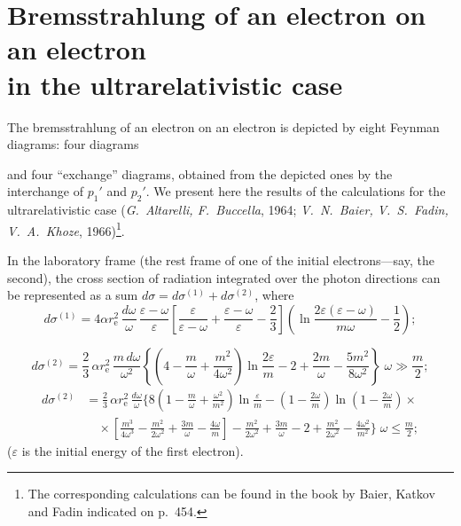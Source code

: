 
\section{Bremsstrahlung of an electron on an electron\\in the ultrarelativistic case}


The bremsstrahlung of an electron on an electron is depicted by eight Feynman diagrams: four diagrams


\vspace{1ex}
\noindent and four ``exchange'' diagrams, obtained from the depicted ones by the interchange of $p_1'$ and $p_2'$. We present here the results of the calculations for the ultrarelativistic case (\emph{G.~Altarelli, F.~Buccella}, 1964; \emph{V.~N.~Baier, V.~S.~Fadin, V.~A.~Khoze}, 1966)\footnote{The corresponding calculations can be found in the book by Baier, Katkov and Fadin indicated on p.~454.}.

In the laboratory frame (the rest frame of one of the initial electrons---say, the second), the cross section of radiation integrated over the photon directions can be represented as a sum $d\sigma = d\sigma^{(1)} + d\sigma^{(2)}$, where
\begin{equation}
d\sigma^{(1)} = 4\alpha r_\mathrm{e}^2\,\frac{d\omega}{\omega}\,\frac{\varepsilon-\omega}{\varepsilon}\!\left[\frac{\varepsilon}{\varepsilon-\omega} + \frac{\varepsilon-\omega}{\varepsilon} - \frac{2}{3}\right]\!\left(\ln\frac{2\varepsilon(\varepsilon-\omega)}{m\omega} - \frac{1}{2}\right);
\label{eq:97.2}
\end{equation}


\begin{equation}
d\sigma^{(2)} = \frac{2}{3}\,\alpha r_\mathrm{e}^2\,\frac{m\,d\omega}{\omega^2}\!\left\{\!\left(4 - \frac{m}{\omega} + \frac{m^2}{4\omega^2}\right)\ln\frac{2\varepsilon}{m} - 2 + \frac{2m}{\omega} - \frac{5m^2}{8\omega^2}\right\}\; \omega \gg \frac{m}{2};
\label{eq:97.3}
\end{equation}
\begin{equation}
\begin{split}
d\sigma^{(2)} &= \frac{2}{3}\,\alpha r_\mathrm{e}^2\,\frac{d\omega}{\omega}\biggl\{8\!\left(1 - \frac{m}{\omega} + \frac{\omega^2}{m^2}\right)\ln\frac{\varepsilon}{m} - \left(1 - \frac{2\omega}{m}\right)\ln\!\left(1 - \frac{2\omega}{m}\right) \times {} \\
&\quad \times \left[\frac{m^3}{4\omega^3} - \frac{m^2}{2\omega^2} + \frac{3m}{\omega} - \frac{4\omega}{m}\right] - \frac{m^2}{2\omega^2} + \frac{3m}{\omega} - 2 + \frac{m^2}{2\omega^2} - \frac{4\omega^2}{m^2}\biggr\}\; \omega \leqslant \frac{m}{2};
\end{split}
\label{eq:97.4}
\end{equation}
($\varepsilon$ is the initial energy of the first electron).

